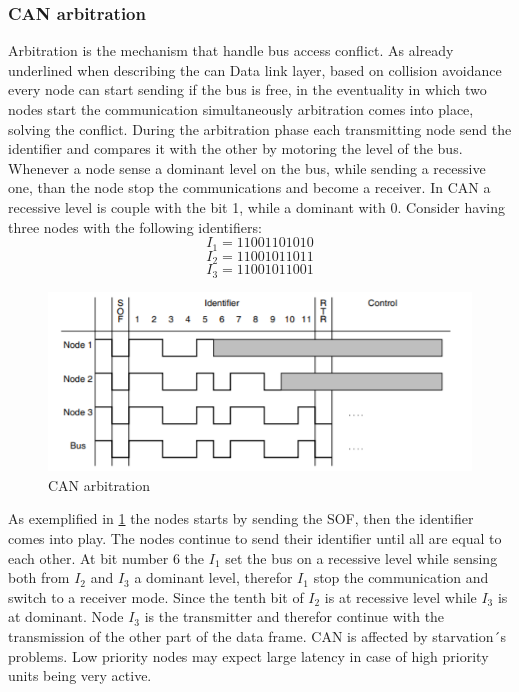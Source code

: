 \documentclass[../main.tex]{subfiles}
\begin{document}
\subsubsection{CAN arbitration}
Arbitration is the mechanism that handle bus access conflict. As already underlined when describing the can Data link layer, based on collision avoidance every node can start sending if the bus is free, in the eventuality in which two nodes start the communication simultaneously arbitration comes into place, solving the conflict. During the arbitration phase each transmitting node send the identifier and compares it with the other by motoring the level of the bus. Whenever a node sense a dominant level on the bus, while sending a recessive one, than the node stop the communications and become a receiver. In CAN a recessive level is couple with the bit 1, while a dominant with 0. Consider having three nodes with the following identifiers:
\begin{equation}
I_{1} = 11001101010
\end{equation}
\begin{equation}
I_{2} = 11001011011
\end{equation}
\begin{equation}
I_{3} = 11001011001
\end{equation}
\begin{figure}[ht]
    \centering
    \includegraphics[width=\linewidth]{images_folder/can_arbitration.png}
    \caption{CAN arbitration}
    \label{fig:CANABR}
\end{figure}
As exemplified in \ref{fig:CANABR} the nodes starts by sending the SOF, then the identifier comes into play. The nodes continue to send their identifier until all are equal to each other. At bit number 6  the $I_1$ set the bus on a recessive level while sensing both from $I_2$ and $I_3$ a dominant level, therefor $I_1$ stop the communication and switch to a receiver mode. Since the tenth bit of $I_2$ is at recessive level while $I_3$ is at dominant. Node $I_3$ is the transmitter and therefor continue with the transmission of the other part of the data frame. CAN is affected by starvation´s problems. Low priority nodes may expect large latency in case of high priority units being very active. \\
\end{document}
